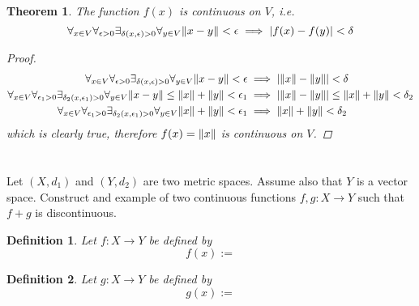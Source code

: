 \documentclass[]{article}
\newtheorem{definition}{Definition}
\newtheorem{theorem}{Theorem}
\begin{document}
\begin{theorem}
    The function $f(x)$ is continuous on $V$, i.e.
    \[
        \forall_{x\in V} \forall_{\epsilon>0} \exists_{\delta(x,\epsilon)>0} \forall_{y\in V} \norm{x - y} < \epsilon \implies \abs{f(x) - f(y)} < \delta
    \]
    \begin{proof}
        \begin{align*}
            \forall_{x\in V} \forall_{\epsilon>0} \exists_{\delta(x,\epsilon)>0} \forall_{y\in V} \norm{x - y} < \epsilon 
                &\implies \abs{\norm{x} - \norm{y}} < \delta\\
            \forall_{x\in V} \forall_{\epsilon_1>0} \exists_{\delta_2(x,\epsilon_1)>0} \forall_{y\in V} \norm{x - y} \leq \norm{x} + \norm{y} < \epsilon_1 
                &\implies \abs{\norm{x} - \norm{y}}\leq \norm{x} + \norm{y} < \delta_2\\
            \forall_{x\in V} \forall_{\epsilon_1>0} \exists_{\delta_2(x,\epsilon_1)>0} \forall_{y\in V} \norm{x} + \norm{y} < \epsilon_1 
                &\implies \norm{x} + \norm{y} < \delta_2\\
        \end{align*}
        which is clearly true, therefore $f(x) = \norm{x}$ is continuous on $V$.
    \end{proof}
\end{theorem}


\newpage
\section{}
Let $(X,d_1)$ and $(Y,d_2)$ are two metric spaces.
Assume also that $Y$ is a vector space.
Construct and example of two continuous functions $f,g : X \to Y$ such that $f + g$ is discontinuous.

\begin{definition}
    Let $f : X \to Y$ be defined by
    \[
        f(x) := 
    \]
\end{definition}
\begin{definition}
    Let $g : X \to Y$ be defined by
    \[
        g(x) := 
    \]
\end{definition}
\end{document}
